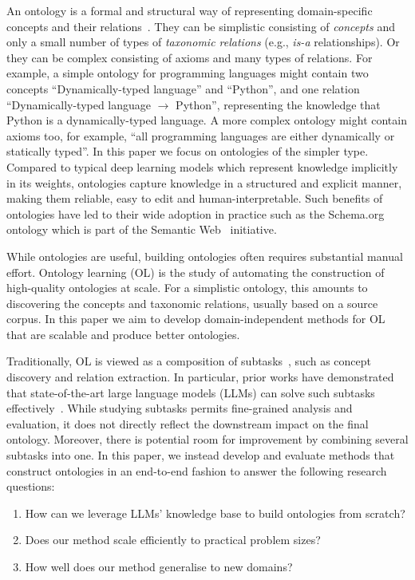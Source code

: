 \documentclass{article}
\begin{document}
An ontology is a formal and structural way of representing domain-specific concepts and their relations~\cite{gruber1995toward}.
They can be simplistic consisting of \emph{concepts} and only a small number of types of \emph{taxonomic relations} (e.g., \emph{is-a} relationships). Or they can be complex consisting of axioms and many types of relations.
For example, a simple ontology for programming languages might contain two concepts ``Dynamically-typed language'' and ``Python'', and one relation ``Dynamically-typed language $\to$ Python'', representing the knowledge that Python is a dynamically-typed language. A more complex ontology might contain axioms too, for example, ``all programming languages are either dynamically or statically typed''.
In this paper we focus on ontologies of the simpler type. Compared to typical deep learning models which represent knowledge implicitly in its weights, ontologies capture knowledge in a structured and explicit manner, making them reliable, easy to edit and human-interpretable. Such benefits of ontologies have led to their wide adoption in practice such as the  Schema.org~\cite{Schema.org_2011} ontology which is part of the Semantic Web~\cite{antoniou2004semantic} initiative.

While ontologies are useful, building ontologies often requires substantial manual effort. Ontology learning (OL) is the study of automating the construction of high-quality ontologies at scale. For a simplistic ontology, this amounts to discovering the concepts and taxonomic relations, usually based on a source corpus. In this paper we aim to develop domain-independent methods for OL that are scalable and produce better ontologies.

Traditionally, OL is viewed as a composition of subtasks~\cite{asim2018survey}, such as concept discovery and relation extraction. In particular, prior works have demonstrated that state-of-the-art large language models (LLMs) can solve such subtasks effectively~\cite{babaei2023llms4ol}. While studying subtasks permits fine-grained analysis and evaluation, it does not directly reflect the downstream impact on the final ontology. Moreover, there is potential room for improvement by combining several subtasks into one. In this paper, we instead develop and evaluate methods that construct ontologies in an end-to-end fashion to answer the following research questions:
\begin{enumerate}
    \item How can we leverage LLMs' knowledge base to build ontologies from scratch?
    \item Does our method scale efficiently to practical problem sizes?
    \item How well does our method generalise to new domains?
\end{enumerate}
\end{document}
